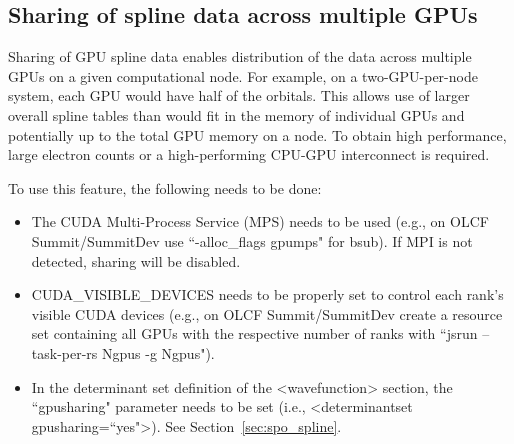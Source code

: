 \subsection{Sharing of spline data across multiple GPUs}

Sharing of GPU spline data enables distribution of the data
across multiple GPUs on a given computational node. For example, on a
two-GPU-per-node system, each GPU would have half of the
orbitals. This allows use of larger overall spline tables than would fit in
the memory of individual GPUs and potentially up to
the total GPU memory on a node. To obtain high performance, large
electron counts or a high-performing CPU-GPU interconnect is required.

To use this feature, the following needs to be done:

\begin{itemize}
    \item The CUDA Multi-Process Service (MPS) needs to be used
      (e.g., on OLCF Summit/SummitDev use ``-alloc\_flags gpumps" for
      bsub). If MPI is not detected, sharing will be disabled.
    \item CUDA\_VISIBLE\_DEVICES needs to be properly set to control each
      rank's visible CUDA devices (e.g., on OLCF Summit/SummitDev create a resource set containing all GPUs with the
      respective number of ranks with ``jsrun --task-per-rs Ngpus -g
      Ngpus").
    \item In the determinant set definition of the <wavefunction>
      section, the ``gpusharing" parameter needs to be set
      (i.e., <determinantset gpusharing=``yes">). See Section~\ref{sec:spo_spline}.
\end{itemize}
